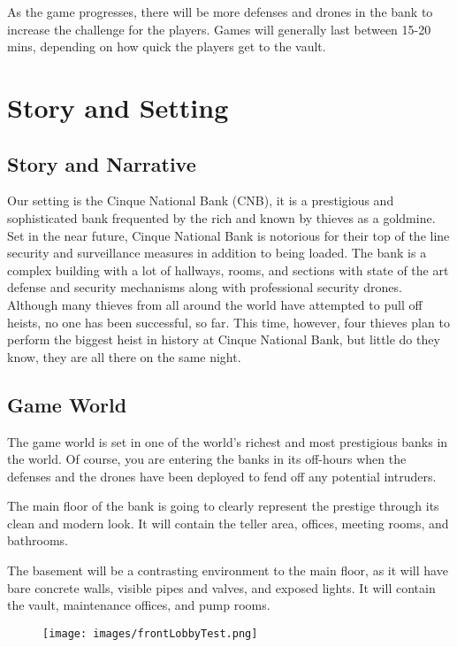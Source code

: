 \documentclass[10pt]{report}
\begin{document}
As the game progresses, there will be more defenses and drones in the bank to increase the challenge for the players. Games will generally last between 15-20 mins, depending on how quick the players get to the vault.

\chapter{Story and Setting}

\section{Story and Narrative}

Our setting is the Cinque National Bank (CNB), it is a prestigious and sophisticated bank frequented by the rich and known by thieves as a goldmine. Set in the near future, Cinque National Bank is notorious for their top of the line security and surveillance measures in addition to being loaded.  The bank is a complex building with a lot of hallways, rooms, and sections with state of the art defense and security mechanisms along with professional security drones. Although many thieves from all around the world have attempted to pull off heists, no one has been successful, so far. This time, however, four thieves plan to perform the biggest heist in history at Cinque National Bank, but little do they know, they are all there on the same night.

\section{Game World}

The game world is set in one of the world’s richest and most prestigious banks in the world. Of course, you are entering the banks in its off-hours when the defenses and the drones have been deployed to fend off any potential intruders. 

The main floor of the bank is going to clearly represent the prestige through its clean and modern look. It will contain the teller area, offices, meeting rooms, and bathrooms. 

The basement will be a contrasting environment to the main floor, as it will have bare concrete walls, visible pipes and valves, and exposed lights. It will contain the vault, maintenance offices, and pump rooms. 

\begin{figure}
    \centering
    \texttt{[image: images/frontLobbyTest.png]}
    \caption{}
\end{figure}
\end{document}

